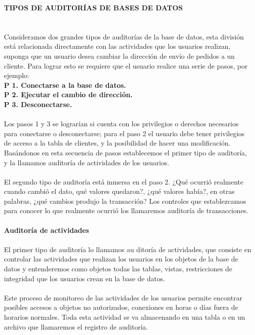 \documentclass[twoside,twocolumn]{article}
\begin{document}
\begin{flushright}
\begin{itemize}
\textbf{TIPOS DE AUDITORÍAS DE BASES DE DATOS}\\
\textbf{}\\
\textbf{}\\
 Consideramos dos grandes tipos de auditorías de la base de datos, esta división está relacionada
directamente con las actividades que los usuarios
realizan, suponga que un usuario desea cambiar la
dirección de envío de pedidos a un cliente. Para
lograr esto se requiere que el usuario realice una
serie de pasos, por ejemplo:
\textbf{}\\
\textbf{P 1. Conectarse a la base de datos.}\\
\textbf{P 2. Ejecutar el cambio de dirección.}\\
\textbf{P 3. Desconectarse.}\\
\textbf{}\\
 Los pasos 1 y 3 se lograrían si cuenta con los
privilegios o derechos necesarios para conectarse
o desconectarse; para el paso 2 el usuario debe
tener privilegios de acceso a la tabla de clientes, y
la posibilidad de hacer una modificación. Basándonos en esta secuencia de pasos establecemos el
primer tipo de auditoría, y la llamamos auditoría
de actividades de los usuarios.
\textbf{}\\
\textbf{}\\
 El segundo tipo de auditoría está inmersa en
el paso 2. ¿Qué ocurrió realmente cuando cambió el
dato, qué valores quedaron?, ¿qué valores había?, en
otras palabras, ¿qué cambios produjo la transacción?
Los controles que establezcamos para conocer lo
que realmente ocurrió los llamaremos auditoría de
transacciones.
\textbf{}\\
\textbf{}\\
\textbf{Auditoría de actividades}\\
\textbf{}\\
 El primer tipo de auditoría lo llamamos au ditoría de actividades, que consiste en controlar las
actividades que realizan los usuarios en los objetos
de la base de datos y entenderemos como objetos
todas las tablas, vistas, restricciones de integridad
que los usuarios crean en la base de datos.\textbf{}\\
\textbf{}\\
 Este proceso de monitoreo de las actividades
de los usuarios permite encontrar posibles accesos a
objetos no autorizados, conexiones en horas o días
fuera de horarios normales. Toda esta actividad se
va almacenando en una tabla o en un archivo que
llamaremos el registro de auditoría.
\textbf{}\\

\end{itemize}
\end{flushright}
\end{document}
